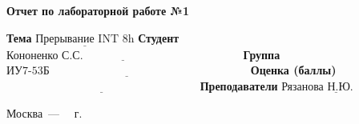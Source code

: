 \begin{titlepage}
	
	\begin{center}
		\Large\textbf{Отчет по лабораторной работе №1}\newline
	\end{center}
	
	\noindent\textbf{Тема} $\underline{\text{Прерывание INT 8h}}$\newline\newline\newline
	\noindent\textbf{Студент} $\underline{\text{Кононенко С.С.~~~~~~~~~~~~~~~~~~~~~~~~~~~~~~~~~~~~~~~~~~}}$\newline\newline
	\noindent\textbf{Группа} $\underline{\text{ИУ7-53Б~~~~~~~~~~~~~~~~~~~~~~~~~~~~~~~~~~~~~~~~~~~~~~~~~~~~~}}$\newline\newline
	\noindent\textbf{Оценка (баллы)} $\underline{\text{~~~~~~~~~~~~~~~~~~~~~~~~~~~~~~~~~~~~~~~~~~~~~~~~~~~}}$\newline\newline
	\noindent\textbf{Преподаватели} $\underline{\text{Рязанова Н.Ю.~~~~~~~~~~}}$\newline
	
	\begin{center}
		\vfill
		Москва~---~\the\year
		~г.
	\end{center}
 \restoregeometry
\end{titlepage}
